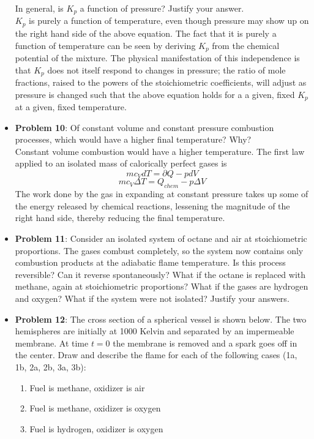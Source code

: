 \documentclass[11pt]{article}
\newcommand{\Item}[1]{\item \textbf{#1}:}
\newcommand{\CenteredBoxed}[1]{\begin{center}\boxed{#1}\end{center}}
\newcommand{\Problem}[1]{\Item{Problem #1}}
\begin{document}
\begin{itemize}
\CenteredBoxed{K_p = \frac{\chi_C^c}{\chi_A^a\chi_B^b}p^{(c-(a+b))}}

In general, is $K_p$ a function of pressure? Justify your answer.\\

$K_p$ is purely a function of temperature, even though pressure may show up on the right hand side of the above equation. The fact that it is purely a function of temperature can be seen by deriving $K_p$ from the chemical potential of the mixture. The physical manifestation of this independence is that $K_p$ does not itself respond to changes in pressure; the ratio of mole fractions, raised to the powers of the stoichiometric coefficients, will adjust as pressure is changed such that the above equation holds for a a given, fixed $K_p$ at a given, fixed temperature.

\Problem{10} Of constant volume and constant pressure combustion processes, which would have a higher final temperature? Why?\\

Constant volume combustion would have a higher temperature. The first law applied to an isolated mass of calorically perfect gases is
$$mc_VdT = \partial Q - pdV$$
$$mc_V\Delta T = Q_{chem} - p\Delta V$$
The work done by the gas in expanding at constant pressure takes up some of the energy released by chemical reactions, lessening the magnitude of the right hand side, thereby reducing the final temperature.

\Problem{11} Consider an isolated system of octane and air at stoichiometric proportions. The gases combust completely, so the system now contains only combustion products at the adiabatic flame temperature. Is this process reversible? Can it reverse spontaneously? What if the octane is replaced with methane, again at stoichiometric proportions? What if the gases are hydrogen and oxygen? What if the system were not isolated? Justify your answers.\\

\Problem{12} The cross section of a spherical vessel is shown below. The two hemispheres are initially at 1000 Kelvin and separated by an impermeable membrane. At time $t=0$ the membrane is removed and a spark goes off in the center. Draw and describe the flame for each of the following cases (1a, 1b, 2a, 2b, 3a, 3b):\\

\begin{minipage}{0.48\textwidth}
\begin{enumerate}
	\item Fuel is methane, oxidizer is air
	\item Fuel is methane, oxidizer is oxygen
	\item Fuel is hydrogen, oxidizer is oxygen
	\end{enumerate}
	

\end{minipage}
\end{itemize}
\end{document}
